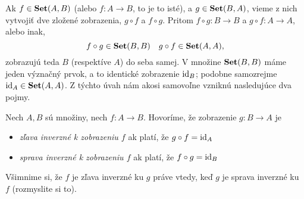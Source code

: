 Ak $f\in\mathbf{Set}(A,B)$ (alebo $f\colon A\to B$, to je to isté), a $g\in\mathbf{Set}(B,A)$,
vieme z nich vytvojiť dve zložené zobrazenia, $g\circ f$ a $f\circ g$. Pritom
$f\circ g\colon B\to B$ a $g\circ f\colon A\to A$, alebo inak,
\[
f\circ g\in\mathbf{Set}(B,B)\quad g\circ f\in\mathbf{Set}(A,A),
\]
zobrazujú teda $B$ (respektíve $A$) do seba samej.
V množine $\mathbf{Set}(B,B)$ máme jeden význačný prvok, a to identické zobrazenie
$\mathrm{id}_B$; podobne samozrejme $\mathrm{id}_A\in\mathbf{Set}(A,A)$. Z týchto úvah nám akosi samovoľne vzniknú nasledujúce dva pojmy.
\begin{definition}\label{def:zlavaSpravaInverzne}
Nech $A,B$ sú množiny, nech $f\colon A\to B$. Hovoríme, že zobrazenie $g\colon B\to A$ je
\begin{itemize}
\item \emph{zľava inverzné k zobrazeniu $f$} ak platí, že $g\circ f=\mathrm{id}_A$
\item \emph{sprava inverzné k zobrazeniu $f$} ak platí, že $f\circ g=\mathrm{id}_B$
\end{itemize}
\end{definition}

Všimnime si, že $f$ je zľava inverzné ku $g$ práve vtedy, keď $g$ je sprava inverzné
ku $f$ (rozmyslite si to).

